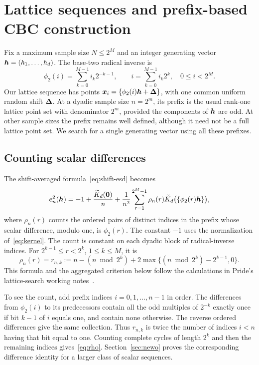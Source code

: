 \section{Lattice sequences and prefix-based CBC construction}
\label{sec:lattice}

Fix a maximum sample size $N\le 2^M$ and an integer generating vector
$\boldsymbol{h}=(h_1,\ldots,h_d)$. The base-two radical inverse is
\[
 \phi_2(i)=\sum_{k=0}^{M-1}i_k2^{-k-1},
 \qquad i=\sum_{k=0}^{M-1}i_k2^k,\quad 0\le i<2^M.
\]
Our lattice sequence has points
$\boldsymbol{x}_i=\{\phi_2(i)\boldsymbol{h}+\boldsymbol{\Delta}\}$, with one common uniform random
shift $\boldsymbol{\Delta}$. At a dyadic sample size $n=2^m$, its prefix is the usual
rank-one lattice point set with denominator $2^m$, provided the components of
$\boldsymbol{h}$ are odd. At other sample sizes the prefix remains well defined, although
it need not be a full lattice point set. We search for a single generating
vector using all these prefixes.

\subsection{Counting scalar differences}

The shift-averaged formula~\eqref{eq:shift-esd} becomes
\begin{equation}\label{eq:lattice-esd}
 e_n^2(\boldsymbol{h})
 =-1+\frac{\widetilde K_d(\boldsymbol{0})}{n}
  +\frac{1}{n^2}\sum_{r=1}^{2^M-1}
       \rho_n(r)\widetilde K_d\bigl(\{\phi_2(r)\boldsymbol{h}\}\bigr),
\end{equation}
where $\rho_n(r)$ counts the ordered pairs of distinct indices in the prefix
whose scalar difference, modulo one, is $\phi_2(r)$. The constant $-1$ uses
the normalization of~\eqref{eq:kernel}.
The count is constant on each dyadic block of radical-inverse indices.
For $2^{k-1}\le r<2^k$, $1\le k\le M$, it is
\begin{equation}\label{eq:rho}
 \rho_n(r)=r_{n,k}:=
 n-(n\bmod 2^k)
 +2\max\{(n\bmod 2^k)-2^{k-1},0\}.
\end{equation}
This formula and the aggregated criterion below follow the calculations in
Pride's lattice-search working notes~\cite{pride-lattice-notes}.

To see the count, add prefix indices $i=0,1,\ldots,n-1$ in order.
The differences from $\phi_2(i)$ to its predecessors contain all the odd
multiples of $2^{-k}$ exactly once if bit $k-1$ of $i$ equals one, and contain
none otherwise. The reverse ordered differences give the same collection.
Thus $r_{n,k}$ is twice the number of indices $i<n$ having that bit equal to
one. Counting complete cycles of length $2^k$ and then the remaining indices
gives~\eqref{eq:rho}. Section~\ref{sec:newo} proves the corresponding difference
identity for a larger class of scalar sequences.

